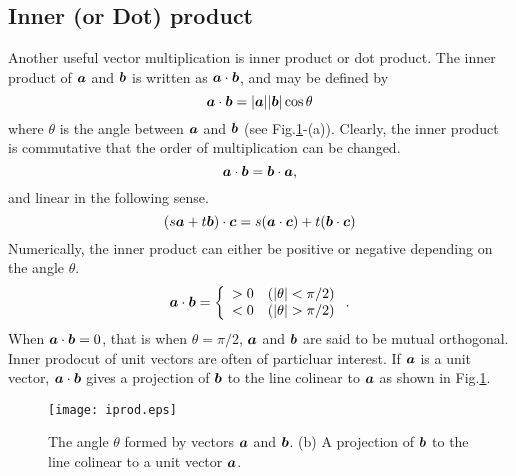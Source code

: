 \documentclass[10pt,a4j]{article}
\begin{document}
\subsection{Inner (or Dot) product} 
Another useful vector multiplication is inner product or dot product.
The inner product of $\mbox{\boldmath $a$}$ and $\mbox{\boldmath $b$}$ is written as $\mbox{\boldmath $a$}\cdot\mbox{\boldmath $b$}$, 
and may be defined by 
\begin{equation}
	\mbox{\boldmath $a$}\cdot\mbox{\boldmath $b$}=|\mbox{\boldmath $a$}||\mbox{\boldmath $b$}|\cos\theta
\end{equation}
where $\theta$ is the angle between $\mbox{\boldmath $a$}$ and $\mbox{\boldmath $b$}$ (see Fig.\ref{fig:fig1_5}-(a)). 
Clearly, the inner product is commutative that the order of multiplication 
can be changed.
\begin{equation}
	\mbox{\boldmath $a$}\cdot\mbox{\boldmath $b$}
	=
	\mbox{\boldmath $b$}\cdot\mbox{\boldmath $a$}, 
	\label{eqn:}
\end{equation}
and linear in the following sense.
\begin{equation}
	\left(s\mbox{\boldmath $a$}+t\mbox{\boldmath $b$}\right)\cdot\mbox{\boldmath $c$}
	=
	s(\mbox{\boldmath $a$}\cdot\mbox{\boldmath $c$})+t(\mbox{\boldmath $b$}\cdot \mbox{\boldmath $c$})
	\label{eqn:}
\end{equation}
Numerically, the inner product can either be positive or negative 
depending on the angle $\theta$.
\begin{equation}
	\mbox{\boldmath $a$}\cdot\mbox{\boldmath $b$}
	=
	\left\{
	\begin{array}{cc}
		>0 & ( |\theta|< \pi/2) \\
		<0 & ( |\theta| > \pi/2)
	\end{array}
	\right.
	.
	\label{eqn:}
\end{equation}
When $\mbox{\boldmath $a$}\cdot\mbox{\boldmath $b$}=0$, that is when $\theta=\pi/2$, $\mbox{\boldmath $a$}$ and $\mbox{\boldmath $b$}$ 
are said to be mutual orthogonal.
Inner prodocut of unit vectors are often of particluar interest. 
If $\mbox{\boldmath $a$}$ is a unit vector, $\mbox{\boldmath $a$}\cdot\mbox{\boldmath $b$}$ gives a projection of $\mbox{\boldmath $b$}$ 
to the line colinear to $\mbox{\boldmath $a$}$ as shown in Fig.\ref{fig:fig1_5}. 
\begin{figure}[h]
	\begin{center}
	\texttt{[image: iprod.eps]} 
	\end{center}
	\caption{The angle $\theta$ formed by vectors $\mbox{\boldmath $a$}$ and $\mbox{\boldmath $b$}$. 
	(b) A projection of $\mbox{\boldmath $b$}$ to the line colinear to a unit vector $\mbox{\boldmath $a$}$.} 
	\label{fig:fig1_5}
\end{figure}
\end{document}
